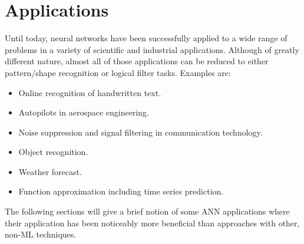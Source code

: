 \documentclass[10pt,a4paper,DIV=11]{scrreprt}
\begin{document}
\section{Applications}
\label{sec:exp}
Until today, neural networks have been successfully applied to a wide range of problems in a variety of scientific and industrial applications. 
Although of greatly different nature, almost all of those applications can be reduced to either pattern/shape recognition or logical filter tasks. 
Examples are:\\
\begin{itemize}
    \item Online recognition of handwritten text.
    \item Autopilots in aerospace engineering.
    \item Noise suppression and signal filtering in communication technology.
    \item Object recognition.
    \item Weather forecast.
    \item Function approximation including time series prediction. 
\end{itemize} 

The following sections will give a brief notion of some ANN applications where their application has been noticeably more beneficial than approaches 
with other, non-ML techniques.
\end{document}
